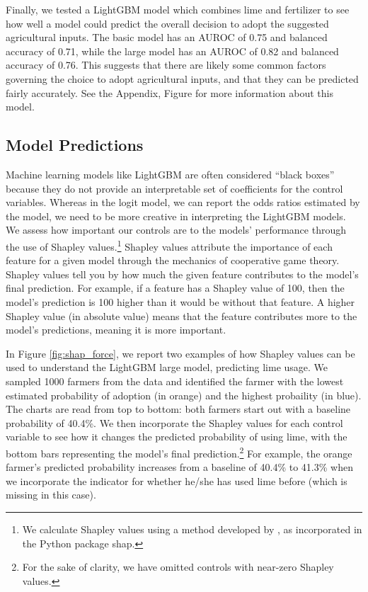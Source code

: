 \documentclass[12pt]{article}
\begin{document}
Finally, we tested a LightGBM model which combines lime and fertilizer to see how well a model could predict the overall decision to adopt the suggested agricultural inputs. The basic model has an AUROC of 0.75 and balanced accuracy of 0.71, while the large model has an AUROC of 0.82 and balanced accuracy of 0.76. This suggests that there are likely some common factors governing the choice to adopt agricultural inputs, and that they can be predicted fairly accurately. See the Appendix, Figure  for more information about this model.

\subsection{Model Predictions}
Machine learning models like LightGBM are often considered ``black boxes'' because they do not provide an interpretable set of coefficients for the control variables. Whereas in the logit model, we can report the odds ratios estimated by the model, we need to be more creative in interpreting the LightGBM models. We assess how important our controls are to the models' performance through the use of Shapley values.\footnote{We calculate Shapley values using a method developed by \textcite{lundberg_unified_2017}, as incorporated in the Python package \textsf{shap}.} Shapley values attribute the importance of each feature for a given model through the mechanics of cooperative game theory. Shapley values tell you by how much the given feature contributes to the model's final prediction. For example, if a feature has a Shapley value of 100, then the model's prediction is 100 higher than it would be without that feature. A higher Shapley value (in absolute value) means that the feature contributes more to the model's predictions, meaning it is more important.

In Figure \ref{fig:shap_force}, we report two examples of how Shapley values can be used to understand the LightGBM large model, predicting lime usage. We sampled 1000 farmers from the data and identified the farmer with the lowest estimated probability of adoption (in orange) and the highest probaility (in blue). The charts are read from top to bottom: both farmers start out with a baseline probability of 40.4\%. We then incorporate the Shapley values for each control variable to see how it changes the predicted probability of using lime, with the bottom bars representing the model's final prediction.\footnote{For the sake of clarity, we have omitted controls with near-zero Shapley values.} For example, the orange farmer's predicted probability increases from a baseline of 40.4\% to 41.3\% when we incorporate the indicator for whether he/she has used lime before (which is missing in this case). 
\end{document}
